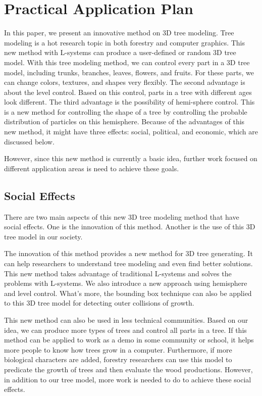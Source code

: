 \section{Practical Application Plan} 

In this paper, we present an innovative method on 3D tree modeling. Tree modeling is a hot research topic in both forestry and computer graphics. This new method with L-systems can produce a user-defined or random 3D tree model. With this tree modeling method, we can control every part in a 3D tree model, including trunks, branches, leaves, flowers, and fruits. For these parts, we can change colors, textures, and shapes very flexibly. The second advantage is about the level control. Based on this control, parts in a tree with different ages look different. The third advantage is the possibility of hemi-sphere control. This is a new method for controlling the shape of a tree by controlling the probable distribution of particles on this hemisphere. Because of the advantages of this new method, it might have three effects: social, political, and economic, which are discussed below.

However, since this new method is currently a basic idea, further work focused on different application areas is need to achieve these goals.

\subsection{Social Effects}

There are two main aspects of this new 3D tree modeling method that have social effects. One is the innovation of this method. Another is the use of this 3D tree model in our society.  

The innovation of this method provides a new method for 3D tree generating. It can help researchers to understand tree modeling and even find better solutions. This new method takes advantage of traditional L-systems and solves the problems with L-systems. We also introduce a new approach using hemisphere and level control. What's more, the bounding box technique can also be applied to this 3D tree model for detecting outer collisions of growth.

This new method can also be used in less technical communities. Based on our idea, we can produce more types of trees and control all parts in a tree. If this method can be applied to work as a demo in some community or school, it helps more people to know how trees grow in a computer. Furthermore, if more biological characters are added, forestry researchers can use this model to predicate the growth of trees and then evaluate the wood productions. However, in addition to our tree model, more work is needed to do to achieve these social effects. 

